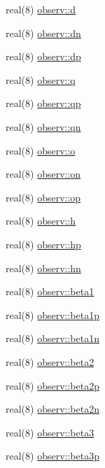 \begin{DoxyCompactItemize}
real(8) \hyperlink{namespaceobserv_aac8164517bfe4101667722dfc46f93f6}{observ\+::d}
\item 
real(8) \hyperlink{namespaceobserv_aa7d55b64ce5daf1649ee9f05b95088fc}{observ\+::dn}
\item 
real(8) \hyperlink{namespaceobserv_aa2afb41c7a18f5680744a85b000d7861}{observ\+::dp}
\item 
real(8) \hyperlink{namespaceobserv_af34b6ff143a2dfdf6559141d5d23fbea}{observ\+::q}
\item 
real(8) \hyperlink{namespaceobserv_a234fb1ce0b2c529dac392fb68a962e8b}{observ\+::qp}
\item 
real(8) \hyperlink{namespaceobserv_af510c9ba2765c7af068833bc25758aa1}{observ\+::qn}
\item 
real(8) \hyperlink{namespaceobserv_af518f12cf84a544107605bba80b46749}{observ\+::o}
\item 
real(8) \hyperlink{namespaceobserv_afd9ef4eafea719e983a484a385cf56b7}{observ\+::on}
\item 
real(8) \hyperlink{namespaceobserv_ac7b149276ccf05582c5270bafacab20b}{observ\+::op}
\item 
real(8) \hyperlink{namespaceobserv_aee3c6d228879577edf3210d8798f5759}{observ\+::h}
\item 
real(8) \hyperlink{namespaceobserv_a5fc280880094ef531157b9000331c609}{observ\+::hp}
\item 
real(8) \hyperlink{namespaceobserv_a7f7bef99d120f798dbf50695ea51cf6f}{observ\+::hn}
\item 
real(8) \hyperlink{namespaceobserv_ae06bf7fff24c07852e4632fc07db4d25}{observ\+::beta1}
\item 
real(8) \hyperlink{namespaceobserv_acedfdb84c130c7157e337792dcaf8d65}{observ\+::beta1p}
\item 
real(8) \hyperlink{namespaceobserv_a249f6a8a7c0799c554876402bd0b20ba}{observ\+::beta1n}
\item 
real(8) \hyperlink{namespaceobserv_a8e4f6f99ecdb81e5aea163822de8628a}{observ\+::beta2}
\item 
real(8) \hyperlink{namespaceobserv_ac3de9feb22a0044fec5f0fc73f3de8f2}{observ\+::beta2p}
\item 
real(8) \hyperlink{namespaceobserv_ab7441a7793132b9693129241f9226285}{observ\+::beta2n}
\item 
real(8) \hyperlink{namespaceobserv_a0fde5336c5d78c45821b53538f702dfb}{observ\+::beta3}
\item 
real(8) \hyperlink{namespaceobserv_a07b229432fc572292d89fdad0b982e2f}{observ\+::beta3p}
\item 

\end{DoxyCompactItemize}
